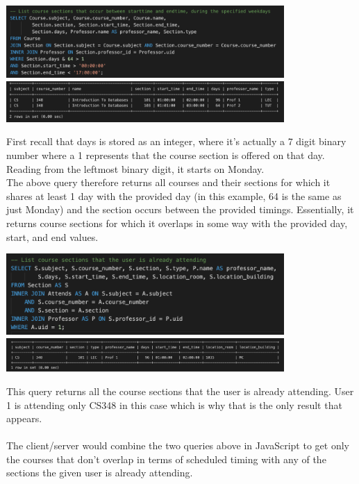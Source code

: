 \documentclass[12pt, a4paper]{article}
\begin{document}
\begin{center}
    \includegraphics[width=400px]{R8/q1}
    \includegraphics[width=400px]{R8/q1out.png}
\end{center}
First recall that days is stored as an integer, where it's actually a 7 digit binary number where a 1 represents that the course section is offered on that day. Reading from the leftmost binary digit, it starts on Monday.\\

The above query therefore returns all courses and their sections for which it shares at least 1 day with the provided day (in this example, 64 is the same as just Monday) and the section occurs between the provided timings. Essentially, it returns course sections for which it overlaps in some way with the provided day, start, and end values.

\begin{center}
    \includegraphics[width=400px]{R8/q2}
    \includegraphics[width=400px]{R8/q2out}
\end{center}
This query returns all the course sections that the user is already attending. User 1 is attending only CS348 in this case which is why that is the only result that appears.\\\\
The client/server would combine the two queries above in JavaScript to get only the courses that don't overlap in terms of scheduled timing with any of the sections the given user is already attending.
\end{document}
